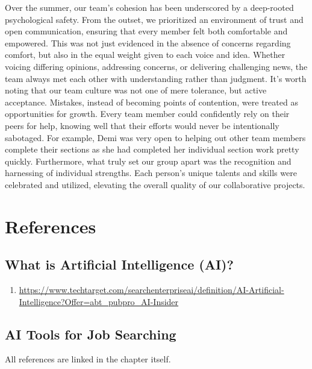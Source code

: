 \documentclass[
]{book}
\providecommand{\tightlist}{%
  \setlength{\itemsep}{0pt}\setlength{\parskip}{0pt}}
\begin{document}
Over the summer, our team's cohesion has been underscored by a deep-rooted psychological safety. From the outset, we prioritized an environment of trust and open communication, ensuring that every member felt both comfortable and empowered. This was not just evidenced in the absence of concerns regarding comfort, but also in the equal weight given to each voice and idea. Whether voicing differing opinions, addressing concerns, or delivering challenging news, the team always met each other with understanding rather than judgment. It's worth noting that our team culture was not one of mere tolerance, but active acceptance. Mistakes, instead of becoming points of contention, were treated as opportunities for growth. Every team member could confidently rely on their peers for help, knowing well that their efforts would never be intentionally sabotaged. For example, Demi was very open to helping out other team members complete their sections as she had completed her individual section work pretty quickly. Furthermore, what truly set our group apart was the recognition and harnessing of individual strengths. Each person's unique talents and skills were celebrated and utilized, elevating the overall quality of our collaborative projects.

\hypertarget{references}{%
\chapter{References}\label{references}}

\hypertarget{what-is-artificial-intelligence-ai-1}{%
\section{What is Artificial Intelligence (AI)?}\label{what-is-artificial-intelligence-ai-1}}

\begin{enumerate}
\def\labelenumi{(\arabic{enumi})}
\tightlist
\item
  \url{https://www.techtarget.com/searchenterpriseai/definition/AI-Artificial-Intelligence?Offer=abt_pubpro_AI-Insider}
\end{enumerate}

\hypertarget{ai-tools-for-job-searching-1}{%
\section{AI Tools for Job Searching}\label{ai-tools-for-job-searching-1}}

All references are linked in the chapter itself.
\end{document}
